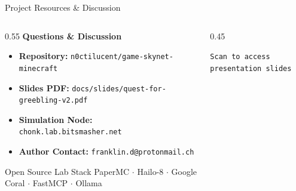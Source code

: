 \documentclass[aspectratio=169]{beamer}
\begin{document}
\begin{frame}{Project Resources \& Discussion}
	\begin{columns}[c]
		\begin{column}{0.55\textwidth}
			{\LARGE \textcolor{accentcyan}{\bfseries Questions \& Discussion}}\par
			\vspace{0.4cm}
			\begin{itemize}\small
				\item \textbf{Repository:} \texttt{n0ctilucent/game-skynet-minecraft}
				\item \textbf{Slides PDF:} \texttt{docs/slides/quest-for-greebling-v2.pdf}
				\item \textbf{Simulation Node:} \texttt{chonk.lab.bitsmasher.net}
				\item \textbf{Author Contact:} \texttt{franklin.d@protonmail.ch}
			\end{itemize}
			\vspace{0.3cm}
			\begin{exampleblock}{Open Source Lab Stack}
				\footnotesize PaperMC $\cdot$ Hailo-8 $\cdot$ Google Coral $\cdot$ FastMCP $\cdot$ Ollama
			\end{exampleblock}
		\end{column}
		\begin{column}{0.45\textwidth}
			\centering
			\par
			\vspace{0.2cm}
			\scriptsize \textcolor{textlight}{\texttt{Scan to access presentation slides}}
		\end{column}
	\end{columns}
\end{frame}
\end{document}

